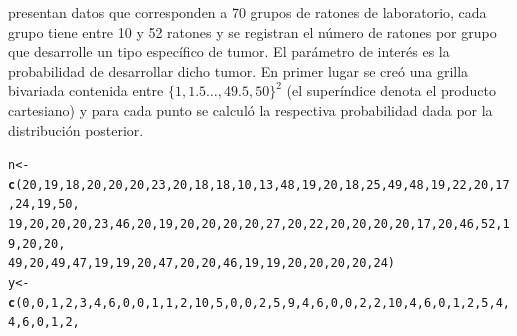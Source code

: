 \documentclass[10pt,openright]{book}\usepackage[]{graphicx}\usepackage[]{color}
\makeatletter
\newcommand{\hlnum}[1]{\textcolor[rgb]{0.686,0.059,0.569}{#1}}%
\newcommand{\hlstd}[1]{\textcolor[rgb]{0.345,0.345,0.345}{#1}}%
\newcommand{\hlkwb}[1]{\textcolor[rgb]{0.69,0.353,0.396}{#1}}%
\newcommand{\hlkwd}[1]{\textcolor[rgb]{0.737,0.353,0.396}{\textbf{#1}}}%
\newenvironment{kframe}{%
 \def\at@end@of@kframe{}%
 \ifinner\ifhmode%
  \def\at@end@of@kframe{\end{minipage}}%
  \begin{minipage}{\columnwidth}%
 \fi\fi%
 \def\FrameCommand##1{\hskip\@totalleftmargin \hskip-\fboxsep
 \colorbox{shadecolor}{##1}\hskip-\fboxsep
     \hskip-\linewidth \hskip-\@totalleftmargin \hskip\columnwidth}%
 \MakeFramed {\advance\hsize-\width
   \@totalleftmargin\z@ \linewidth\hsize
   \@setminipage}}%
 {\par\unskip\endMakeFramed%
 \at@end@of@kframe}
\newenvironment{knitrout}{}{} %
\makeatother
\begin{document}
 presentan datos que corresponden a 70 grupos de ratones de laboratorio, cada grupo tiene entre 10 y 52 ratones y se registran el n\'umero de ratones por grupo que desarrolle un tipo espec\'ifico de tumor. El par\'ametro de inter\'es es la probabilidad de desarrollar dicho tumor. En primer lugar se cre\'o una grilla bivariada contenida entre $\{1,1.5\ldots,49.5,50\}^2$ (el super\'indice denota el producto cartesiano) y para cada punto se calcul\'o la respectiva probabilidad dada por la distribuci\'on posterior.
\begin{knitrout}
\color{fgcolor}\begin{kframe}
\begin{alltt}
\hlstd{n}\hlkwb{<-}\hlkwd{c}\hlstd{(}\hlnum{20}\hlstd{,}\hlnum{19}\hlstd{,}\hlnum{18}\hlstd{,}\hlnum{20}\hlstd{,}\hlnum{20}\hlstd{,}\hlnum{20}\hlstd{,}\hlnum{23}\hlstd{,}\hlnum{20}\hlstd{,}\hlnum{18}\hlstd{,}\hlnum{18}\hlstd{,}\hlnum{10}\hlstd{,}\hlnum{13}\hlstd{,}\hlnum{48}\hlstd{,}\hlnum{19}\hlstd{,}\hlnum{20}\hlstd{,}\hlnum{18}\hlstd{,}\hlnum{25}\hlstd{,}\hlnum{49}\hlstd{,}\hlnum{48}\hlstd{,}\hlnum{19}\hlstd{,}\hlnum{22}\hlstd{,}\hlnum{20}\hlstd{,}\hlnum{17}\hlstd{,}\hlnum{24}\hlstd{,}\hlnum{19}\hlstd{,}\hlnum{50}\hlstd{,}
     \hlnum{19}\hlstd{,}\hlnum{20}\hlstd{,}\hlnum{20}\hlstd{,}\hlnum{20}\hlstd{,}\hlnum{23}\hlstd{,}\hlnum{46}\hlstd{,}\hlnum{20}\hlstd{,}\hlnum{19}\hlstd{,}\hlnum{20}\hlstd{,}\hlnum{20}\hlstd{,}\hlnum{20}\hlstd{,}\hlnum{20}\hlstd{,}\hlnum{27}\hlstd{,}\hlnum{20}\hlstd{,}\hlnum{22}\hlstd{,}\hlnum{20}\hlstd{,} \hlnum{20}\hlstd{,}\hlnum{20}\hlstd{,}\hlnum{20}\hlstd{,}\hlnum{17}\hlstd{,}\hlnum{20}\hlstd{,}\hlnum{46}\hlstd{,}\hlnum{52}\hlstd{,}\hlnum{19}\hlstd{,}\hlnum{20}\hlstd{,}\hlnum{20}\hlstd{,}
     \hlnum{49}\hlstd{,}\hlnum{20}\hlstd{,}\hlnum{49}\hlstd{,}\hlnum{47}\hlstd{,}\hlnum{19}\hlstd{,}\hlnum{19}\hlstd{,}\hlnum{20}\hlstd{,}\hlnum{47}\hlstd{,}\hlnum{20}\hlstd{,}\hlnum{20}\hlstd{,}\hlnum{46}\hlstd{,}\hlnum{19}\hlstd{,}\hlnum{19}\hlstd{,}\hlnum{20}\hlstd{,}\hlnum{20}\hlstd{,}\hlnum{20}\hlstd{,}\hlnum{20}\hlstd{,}\hlnum{24}\hlstd{)}
 \hlstd{y}\hlkwb{<-}\hlkwd{c}\hlstd{(}\hlnum{0}\hlstd{,}\hlnum{0}\hlstd{,}\hlnum{1}\hlstd{,}\hlnum{2}\hlstd{,}\hlnum{3}\hlstd{,}\hlnum{4}\hlstd{,}\hlnum{6}\hlstd{,}\hlnum{0}\hlstd{,}\hlnum{0}\hlstd{,}\hlnum{1}\hlstd{,}\hlnum{1}\hlstd{,}\hlnum{2}\hlstd{,}\hlnum{10}\hlstd{,}\hlnum{5}\hlstd{,}\hlnum{0}\hlstd{,}\hlnum{0}\hlstd{,}\hlnum{2}\hlstd{,}\hlnum{5}\hlstd{,}\hlnum{9}\hlstd{,}\hlnum{4}\hlstd{,}\hlnum{6}\hlstd{,}\hlnum{0}\hlstd{,}\hlnum{0}\hlstd{,}\hlnum{2}\hlstd{,}\hlnum{2}\hlstd{,}\hlnum{10}\hlstd{,}\hlnum{4}\hlstd{,}\hlnum{6}\hlstd{,}\hlnum{0}\hlstd{,}\hlnum{1}\hlstd{,}\hlnum{2}\hlstd{,}\hlnum{5}\hlstd{,}\hlnum{4}\hlstd{,}\hlnum{4}\hlstd{,}\hlnum{6}\hlstd{,}\hlnum{0}\hlstd{,}\hlnum{1}\hlstd{,}\hlnum{2}\hlstd{,}

\end{alltt}
\end{kframe}
\end{knitrout}
\end{document}
